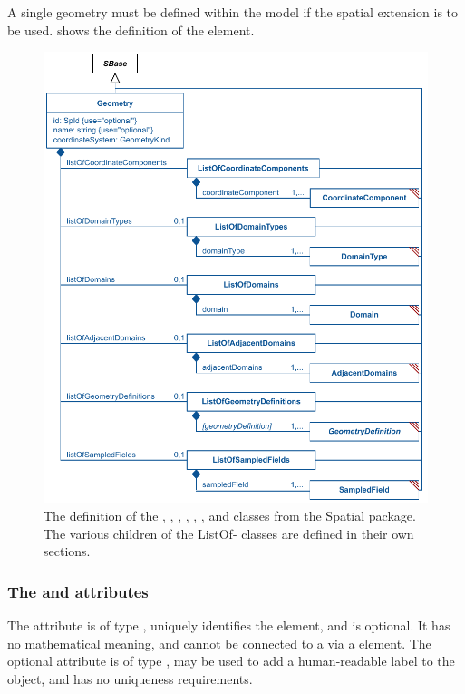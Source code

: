 A single geometry must be defined within the model if the spatial extension is to be used.  shows the definition of the \Geometry element.
 
\begin{figure}[ht]
  \includegraphics{figs/Geometry-uml}
  \caption{The definition of the \Geometry, \ListOfCoordinateComponents, \ListOfDomainTypes, \ListOfDomains, \ListOfAdjacentDomains, \ListOfGeometryDefinitions, and \ListOfSampledFields classes from the Spatial package.  The various children of the ListOf- classes are defined in their own sections.}
  \label{Geometry-uml}
  \label{ListOfCoordinateComponents-uml}
  \label{ListOfDomainTypes-uml}
  \label{ListOfDomains-uml}
  \label{ListOfAdjacentDomains-uml}
  \label{ListOfGeometryDefinitions-uml}
  \label{ListOfSampledFields-uml}
\end{figure}

\subsubsection{The \fixttspace{} and \fixttspace{} attributes}
The  attribute is of type , uniquely identifies the \Geometry element, and is optional.  It has no mathematical meaning, and cannot be connected to a \Parameter via a \SpatialSymbolReference element.  The optional  attribute is of type , may be used to add a human-readable label to the object, and has no uniqueness requirements.

